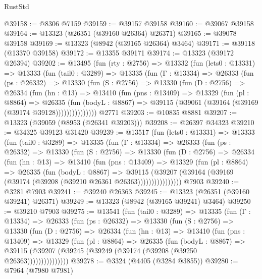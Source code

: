 \begin{lexlean}{RustStd}
\begin{coremodule}
@39158 := @8306 @7159
@39159 := @39157 @39158
@39160 := @39067 @39158
@39164 := @13323 (@26351 (@39160 @26364) @26371)
@39165 := @39078 @39158
@39169 := @13323 (@8942 (@39165 @26364) @3464)
@39171 := @39118 (@13370 @39158)
@39172 := @13355 @39171
@39174 := @13323 (@39172 @26394)
@39202 := @13495
    (fun (rty : @2756) =>
    @13332
      (fun (lets0 : @13331) =>
      @13333
        (fun (tail0 : @3289) =>
        @13335
          (fun (Γ : @13334) =>
          @26333
            (fun (ps : @26332) =>
            @13330
              (fun (S : @2756) =>
              @13330
                (fun (D : @2756) =>
                @26334
                  (fun (hn : @13) =>
                  @13410
                    (fun (pns : @13409) =>
                    @13329
                      (fun (pl : @8864) =>
                      @26335
                        (fun (bodyL : @8867) =>
                        @39115 (@39061 (@39164 (@39169 (@39174 @39128)))))))))))))))
    @2771
@39203 := @10835 @8881
@39207 := @13323 (@39059 (@8953 (@26341 @39203)))
@39208 := @26397 @34323
@39210 := @34325 @39123 @31420
@39239 := @13517
    (fun (lets0 : @13331) =>
    @13333
      (fun (tail0 : @3289) =>
      @13335
        (fun (Γ : @13334) =>
        @26333
          (fun (ps : @26332) =>
          @13330
            (fun (S : @2756) =>
            @13330
              (fun (D : @2756) =>
              @26334
                (fun (hn : @13) =>
                @13410
                  (fun (pns : @13409) =>
                  @13329
                    (fun (pl : @8864) =>
                    @26335
                      (fun (bodyL : @8867) =>
                      @39115
                        (@39207
                          (@39164 (@39169 (@39174 (@39208 (@39210 @26361 @26363))))))))))))))))
    @7903
@39240 := @3281 @7903
@39241 := @39240 @26363
@39245 := @13323 (@26351 (@39160 @39241) @26371)
@39249 := @13323 (@8942 (@39165 @39241) @3464)
@39250 := @39210 @7903
@39275 := @13541
    (fun (tail0 : @3289) =>
    @13335
      (fun (Γ : @13334) =>
      @26333
        (fun (ps : @26332) =>
        @13330
          (fun (S : @2756) =>
          @13330
            (fun (D : @2756) =>
            @26334
              (fun (hn : @13) =>
              @13410
                (fun (pns : @13409) =>
                @13329
                  (fun (pl : @8864) =>
                  @26335
                    (fun (bodyL : @8867) =>
                    @39115 (@39207 (@39245 (@39249 (@39174 (@39208 (@39250 @26363)))))))))))))))
@39278 := @3324 (@4405 (@3284 @3855))
@39280 := @7964 (@7980 @7981)

\end{coremodule}
\end{lexlean}

